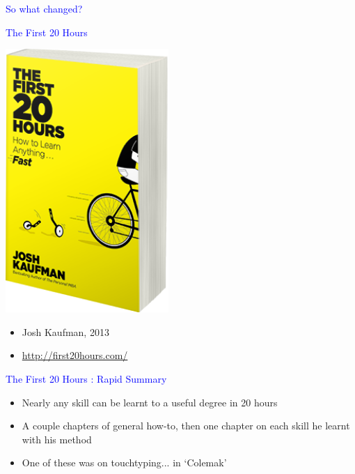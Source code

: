 \documentclass[landscape]{slides}
\begin{document}
\begin{slide}

    \textcolor{blue}{\Large{So what changed?}}

\end{slide}


\begin{slide}

    \textcolor{blue}{\Large{The First 20 Hours}}

    \includegraphics[height=10cm]{first20hours-cover}

    \begin{itemize}
        \item Josh Kaufman, 2013
        \item \url{http://first20hours.com/}
    \end{itemize}

\end{slide}


\begin{slide}

    \textcolor{blue}{\Large{The First 20 Hours : Rapid Summary}}

    \begin{itemize}
        \item Nearly any skill can be learnt to a useful degree in 20 hours
        \item A couple chapters of general how-to, then one chapter on each skill he learnt with his method
        \item One of these was on touchtyping... in `Colemak'
    \end{itemize}

\end{slide}
\end{document}
